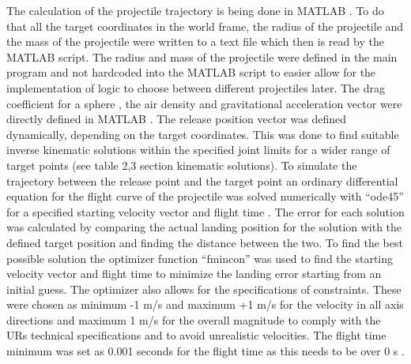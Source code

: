 The calculation of the projectile trajectory is being done in MATLAB \cite{matlab2024b}. To do that all the target coordinates in the world frame, the radius of the projectile and the mass of the projectile were written to a text file which then is read by the MATLAB \cite{matlab2024b} script. The radius and mass of the projectile were defined in the main program and not hardcoded into the MATLAB \cite{matlab2024b} script to easier allow for the implementation of logic to choose between different projectiles later. The drag coefficient for a sphere \cite{dragCoefficient}, the air density \cite{airDensity} and gravitational acceleration vector \cite{gravity} were directly defined in MATLAB \cite{matlab2024b}. The release position vector was defined dynamically, depending on the target coordinates. This was done to find suitable inverse kinematic solutions within the specified joint limits for a wider range of target points (see table 2,3 section kinematic solutions). To simulate the trajectory between the release point and the target point an ordinary differential equation for the flight curve of the projectile was solved numerically with “ode45” \cite{ode45} for a specified starting velocity vector and flight time \cite{dragEquation}. The error for each solution was calculated by comparing the actual landing position for the solution with the defined target position and finding the distance between the two. To find the best possible solution the optimizer function “fmincon” \cite{fmincon} was used to find the starting velocity vector and flight time to minimize the landing error starting from an initial guess. The optimizer also allows for the specifications of constraints. These were chosen as minimum -1 m/s and maximum +1 m/s for the velocity in all axis directions and maximum 1 m/s for the overall magnitude to comply with the URs technical specifications \cite{ur5TechnicalSpecifications} and to avoid unrealistic velocities. The flight time minimum was set as 0.001 seconds for the flight time as this needs to be over 0 s \cite{fmincon}.
